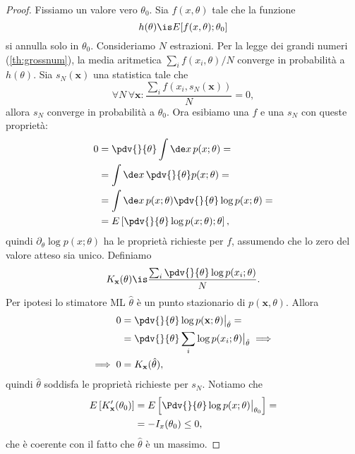 \begin{proof}
	Fissiamo un valore vero $\theta_0$.
	Sia $f(x,\theta)$ tale che la funzione
	\begin{equation*}
		h(\theta)\is E[f(x,\theta);\theta_0]
	\end{equation*}
	si annulla solo in $\theta_0$.
	Consideriamo $N$ estrazioni.
	Per la legge dei grandi numeri (\autoref{th:grossnum}),
	la media aritmetica $\sum_i f(x_i,\theta)/N$ converge in probabilità a $h(\theta)$.
	Sia $s_N(\mathbf x)$ una statistica tale che
	\begin{equation*}
		\forall N \,\forall\mathbf x: \frac{\sum_i f(x_i,s_N(\mathbf x))}N = 0,
	\end{equation*}
	allora $s_N$ converge in probabilità a $\theta_0$.
	Ora esibiamo una $f$ e una $s_N$ con queste proprietà:
	\begin{align*}
		0
		&= \pdv{}{\theta} \int\de x\, p(x;\theta) = \\
		&= \int\de x\, \pdv{}{\theta} p(x;\theta) = \\
		&= \int\de x\, p(x;\theta) \pdv{}{\theta} \log p(x;\theta) = \\
		&= E \left[ \pdv{}{\theta} \log p(x;\theta);\theta \right],
	\end{align*}
	quindi $\partial_\theta \log p(x;\theta)$ ha le proprietà richieste per $f$,
	assumendo che lo zero del valore atteso sia unico.
	Definiamo
	\begin{equation*}
		K_{\mathbf x}(\theta)
		\is \frac{\sum_i \pdv{}{\theta} \log p(x_i;\theta)} N.
	\end{equation*}
	Per ipotesi lo stimatore ML $\hat\theta$ è un punto stazionario di $p(\mathbf x,\theta)$.
	Allora
	\begin{align*}
		0
		&= \pdv{}{\theta} \log p(\mathbf x;\theta) \big|_{\hat\theta} = \\
		&= \pdv{}{\theta} \sum_i \log p(x_i;\theta) \big|_{\hat\theta} \implies \\
		\implies 0
		&= K_{\mathbf x}(\hat\theta),
	\end{align*}
	quindi $\hat\theta$ soddisfa le proprietà richieste per $s_N$.
	Notiamo che
	\begin{align*}
		E \left[ K_{\mathbf x}'(\theta_0) \right]
		&= E \left[ \Pdv{}{\theta} \log p(x;\theta) \big|_{\theta_0} \right] = \\
		&= -I_x(\theta_0)
		\le 0,
	\end{align*}
	che è coerente con il fatto che $\hat\theta$ è un massimo.

\end{proof}
